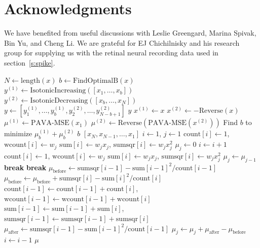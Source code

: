 \documentclass[10pt]{article}
\begin{document}
\section*{Acknowledgments}

We have benefited from useful discussions with Leslie Greengard,
Marina Spivak, Bin Yu, and Cheng Li.
We are grateful for EJ Chichilnisky and his research group
for supplying us with the retinal neural recording data used
in section~\ref{s:spike}.

\appendix %



\begin{algorithm}
\caption{}
\begin{algorithmic}
	\State {}
	\State $N \gets \text{length}(x)$
	\State $b \gets \text{FindOptimalB}(x)$
	\State $y^{(1)} \gets \text{IsotonicIncreasing}([x_1,\dots,x_b])$
	\State $y^{(2)} \gets \text{IsotonicDecreasing}([x_b,\dots,x_N])$
	\State $y \gets [y^{(1)}_1,\dots,y^{(1)}_b,y^{(2)}_2,\dots,y^{(2)}_{N-b+1}]$
	\State \Return $y$
\EndFunction
\Statex
{}
	\Statex {}
	\State $x^{(1)} \gets x$
	\State $x^{(2)} \gets -\text{Reverse}(x)$
	\State $\mu^{(1)} \gets \text{PAVA-MSE}(x_1)$	
	\State $\mu^{(2)} \gets \text{Reverse}(\text{PAVA-MSE}(x^{(2)}))$
	\State Find $b$ to minimize $\mu^{(1)}_b+\mu^{(2)}_b$
	\State \Return $b$
\EndFunction
\Statex
{}
	\State {}
	\State \Return $[x_N,x_{N-1},\dots,x_1]$
\EndFunction
\Statex
{}          %
	\State {}
	\State $i \gets 1$, $j \gets 1$
	\State $\text{count}[i] \gets 1$, $\text{wcount}[i] \gets w_j$
	\State $\text{sum}[i] \gets w_j x_j$, $\text{sumsqr}[i] \gets w_j x_j^2$
	\State $\mu_j \gets 0$
	\State
		\State $i \gets i+1$
		\State $\text{count}[i] \gets 1$, $\text{wcount}[i] \gets w_j$
		\State $\text{sum}[i] \gets w_j x_j$, $\text{sumsqr}[i] \gets w_j x_j^2$
		\State $\mu_j \gets \mu_{j-1}$
		\Loop
				\textbf{ break} 
			\EndIf
				\textbf{ break} 
			\Else {}
				\State $\mu_{\text{before}}\gets\text{sumsqr}[i-1]-\text{sum}[i-1]^2/\text{count}[i-1]$
				\State $\mu_{\text{before}}\gets \mu_{\text{before}}+\text{sumsqr}[i]-\text{sum}[i]^2/\text{count}[i]$
				\State $\text{count}[i-1] \gets \text{count}[i-1]+\text{count}[i]$, $\text{wcount}[i-1] \gets \text{wcount}[i-1]+\text{wcount}[i]$
				\State $\text{sum}[i-1] \gets \text{sum}[i-1]+\text{sum}[i]$, $\text{sumsqr}[i-1] \gets \text{sumsqr}[i-1]+\text{sumsqr}[i]$
				\State $\mu_{\text{after}}\gets\text{sumsqr}[i-1]-\text{sum}[i-1]^2/\text{count}[i-1]$
				\State $\mu_j\gets \mu_j+\mu_{\text{after}}-\mu_{\text{before}}$
				\State $i\gets i-1$
			\EndIf
		\EndLoop
	\EndFor
	\State \Return $\mu$
\EndFunction


\end{algorithmic}
\end{algorithm}
\end{document}
